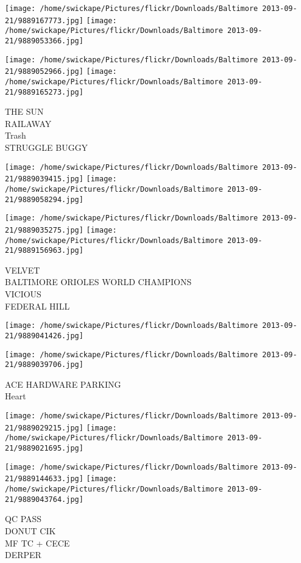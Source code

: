 \documentclass[10pt,letterpaper]{article}
\begin{document}
\texttt{[image: /home/swickape/Pictures/flickr/Downloads/Baltimore 2013-09-21/9889167773.jpg]}
\texttt{[image: /home/swickape/Pictures/flickr/Downloads/Baltimore 2013-09-21/9889053366.jpg]}

\texttt{[image: /home/swickape/Pictures/flickr/Downloads/Baltimore 2013-09-21/9889052966.jpg]}
\texttt{[image: /home/swickape/Pictures/flickr/Downloads/Baltimore 2013-09-21/9889165273.jpg]}

THE SUN\\
RAILAWAY\\
Trash\\
STRUGGLE BUGGY
\pagebreak

\texttt{[image: /home/swickape/Pictures/flickr/Downloads/Baltimore 2013-09-21/9889039415.jpg]}
\texttt{[image: /home/swickape/Pictures/flickr/Downloads/Baltimore 2013-09-21/9889058294.jpg]}

\texttt{[image: /home/swickape/Pictures/flickr/Downloads/Baltimore 2013-09-21/9889035275.jpg]}
\texttt{[image: /home/swickape/Pictures/flickr/Downloads/Baltimore 2013-09-21/9889156963.jpg]}

VELVET\\
BALTIMORE ORIOLES WORLD CHAMPIONS\\
VICIOUS\\
FEDERAL HILL
\pagebreak

\texttt{[image: /home/swickape/Pictures/flickr/Downloads/Baltimore 2013-09-21/9889041426.jpg]}

\vspace{0.25in}
\texttt{[image: /home/swickape/Pictures/flickr/Downloads/Baltimore 2013-09-21/9889039706.jpg]}

ACE HARDWARE PARKING\\
Heart
\pagebreak

\texttt{[image: /home/swickape/Pictures/flickr/Downloads/Baltimore 2013-09-21/9889029215.jpg]}
\texttt{[image: /home/swickape/Pictures/flickr/Downloads/Baltimore 2013-09-21/9889021695.jpg]}

\texttt{[image: /home/swickape/Pictures/flickr/Downloads/Baltimore 2013-09-21/9889144633.jpg]}
\texttt{[image: /home/swickape/Pictures/flickr/Downloads/Baltimore 2013-09-21/9889043764.jpg]}

QC PASS\\
DONUT CIK\\
MF TC + CECE\\
DERPER
\pagebreak
\end{document}
